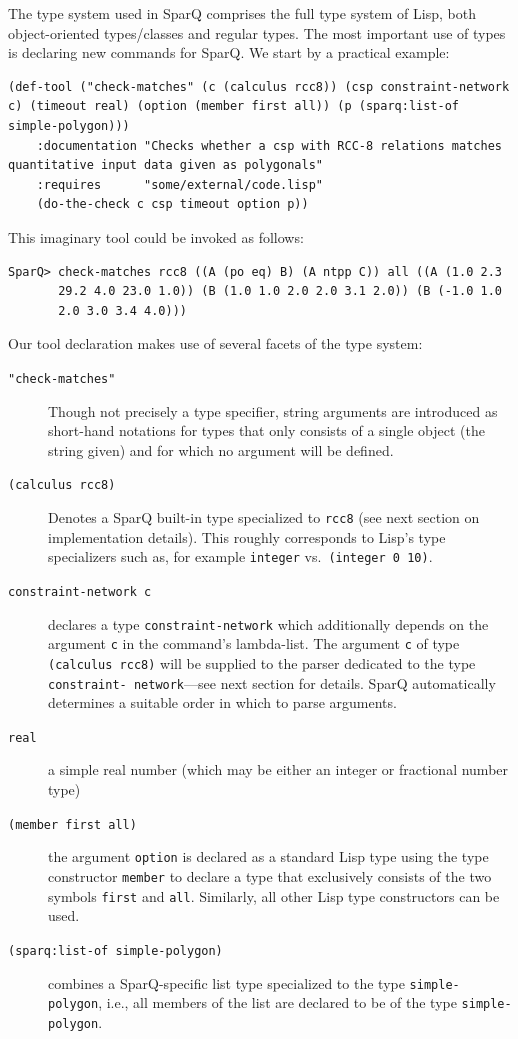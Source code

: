 \documentclass[headsepline]{scrreprt}
\theoremstyle{definition}
\newcommand{\engine}{SparQ}
\begin{document}
The type system used in \engine{} comprises the full type system of Lisp, both object-oriented types/classes and regular types. The most important use of types is declaring new commands for \engine{}. We start by a practical example:

\begin{lstlisting}
(def-tool ("check-matches" (c (calculus rcc8)) (csp constraint-network c) (timeout real) (option (member first all)) (p (sparq:list-of simple-polygon)))
    :documentation "Checks whether a csp with RCC-8 relations matches quantitative input data given as polygonals"
    :requires      "some/external/code.lisp"
    (do-the-check c csp timeout option p))
\end{lstlisting}

This imaginary tool could be invoked as follows:
\begin{verbatim}
SparQ> check-matches rcc8 ((A (po eq) B) (A ntpp C)) all ((A (1.0 2.3 
       29.2 4.0 23.0 1.0)) (B (1.0 1.0 2.0 2.0 3.1 2.0)) (B (-1.0 1.0 
       2.0 3.0 3.4 4.0)))
\end{verbatim}

Our tool declaration makes use of several facets of the type system:
\begin{description}
	\item[{\tt "check-matches"}] Though not precisely a type specifier, string arguments are introduced as short-hand notations for types that only consists of a single object (the string given) and for which no argument will be defined.
	
	\item[{\tt (calculus rcc8)}] Denotes a \engine{} built-in type specialized to {\tt rcc8} (see next section on implementation details). This roughly corresponds to Lisp's type specializers such as, for example {\tt integer} vs.~{\tt (integer 0 10)}.
	
	\item[{\tt constraint-network c}] declares a type {\tt constraint-network} which additionally depends on the argument {\tt c} in the command's lambda-list. The argument {\tt c} of type {\tt (calculus rcc8)} will be supplied to the parser dedicated to the type {\tt constraint- network}---see next section for details. \engine{} automatically determines a suitable order in which to parse arguments.
	
	\item[{\tt real}] a simple real number (which may be either an integer or fractional number type)

	\item[{\tt (member first all)}] the argument {\tt option} is declared as a standard Lisp type using the type constructor {\tt member} to declare a type that exclusively consists of the two symbols {\tt first} and {\tt all}. Similarly, all other Lisp type constructors can be used.
		
	\item[{\tt (sparq:list-of simple-polygon)}] combines a \engine{}-specific list type specialized to the type {\tt simple-polygon}, i.e., all members of the list are declared to be of the type {\tt simple-polygon}.
	
\end{description}
\end{document}
